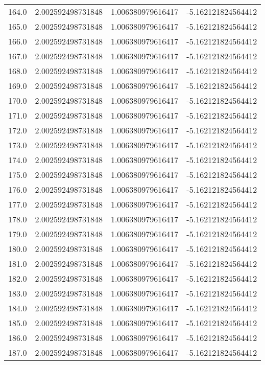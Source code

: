 \begin{longtable}{lrrr}
164.0 & 2.002592498731848 & 1.006380979616417 & -5.162121824564412 \\
165.0 & 2.002592498731848 & 1.006380979616417 & -5.162121824564412 \\
166.0 & 2.002592498731848 & 1.006380979616417 & -5.162121824564412 \\
167.0 & 2.002592498731848 & 1.006380979616417 & -5.162121824564412 \\
168.0 & 2.002592498731848 & 1.006380979616417 & -5.162121824564412 \\
169.0 & 2.002592498731848 & 1.006380979616417 & -5.162121824564412 \\
170.0 & 2.002592498731848 & 1.006380979616417 & -5.162121824564412 \\
171.0 & 2.002592498731848 & 1.006380979616417 & -5.162121824564412 \\
172.0 & 2.002592498731848 & 1.006380979616417 & -5.162121824564412 \\
173.0 & 2.002592498731848 & 1.006380979616417 & -5.162121824564412 \\
174.0 & 2.002592498731848 & 1.006380979616417 & -5.162121824564412 \\
175.0 & 2.002592498731848 & 1.006380979616417 & -5.162121824564412 \\
176.0 & 2.002592498731848 & 1.006380979616417 & -5.162121824564412 \\
177.0 & 2.002592498731848 & 1.006380979616417 & -5.162121824564412 \\
178.0 & 2.002592498731848 & 1.006380979616417 & -5.162121824564412 \\
179.0 & 2.002592498731848 & 1.006380979616417 & -5.162121824564412 \\
180.0 & 2.002592498731848 & 1.006380979616417 & -5.162121824564412 \\
181.0 & 2.002592498731848 & 1.006380979616417 & -5.162121824564412 \\
182.0 & 2.002592498731848 & 1.006380979616417 & -5.162121824564412 \\
183.0 & 2.002592498731848 & 1.006380979616417 & -5.162121824564412 \\
184.0 & 2.002592498731848 & 1.006380979616417 & -5.162121824564412 \\
185.0 & 2.002592498731848 & 1.006380979616417 & -5.162121824564412 \\
186.0 & 2.002592498731848 & 1.006380979616417 & -5.162121824564412 \\
187.0 & 2.002592498731848 & 1.006380979616417 & -5.162121824564412 \\

\end{longtable}

